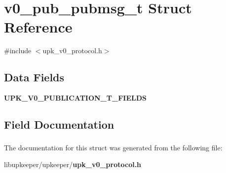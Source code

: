 \section{v0\_\-pub\_\-pubmsg\_\-t Struct Reference}
\label{structv0__pub__pubmsg__t}


{\ttfamily \#include $<$upk\_\-v0\_\-protocol.h$>$}

\subsection*{Data Fields}
\begin{DoxyCompactItemize}
\item 
{\bf UPK\_\-V0\_\-PUBLICATION\_\-T\_\-FIELDS}
\end{DoxyCompactItemize}


\subsection{Field Documentation}
\subsubsection[{UPK\_\-V0\_\-PUBLICATION\_\-T\_\-FIELDS}]{}\label{structv0__pub__pubmsg__t_a3912425125966a06c2e7a0b277e639b9}


The documentation for this struct was generated from the following file:\begin{DoxyCompactItemize}
\item 
libupkeeper/upkeeper/{\bf upk\_\-v0\_\-protocol.h}\end{DoxyCompactItemize}
